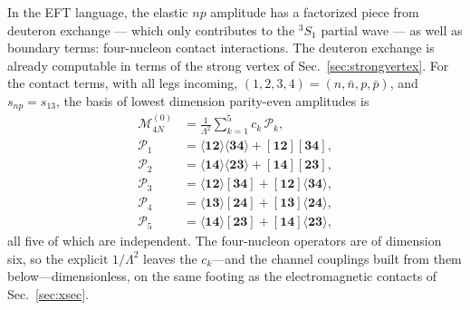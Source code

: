 \documentclass[
  aps,prd,twocolumn,nofootinbib,superscriptaddress,
  longbibliography,floatfix,preprintnumbers
]{revtex4-2}
\newcommand{\ad}[2]{\langle #1 #2\rangle}
\newcommand{\sq}[2]{[#1 #2]}
\begin{document}
In the EFT language, the elastic $np$ amplitude has a factorized piece from deuteron exchange --- which only contributes to the ${}^{3}S_1$ partial wave ---  as well as boundary terms: four-nucleon contact interactions.  The deuteron exchange is already computable in terms of the strong vertex of Sec.~\ref{sec:strongvertex}.  For the contact terms, with all legs incoming,
$(1,2,3,4)=(n,\bar n,p,\bar p)$, and $s_{np}=s_{13}$, the basis of lowest dimension parity-even amplitudes is
\begin{equation}
\begin{split}
  \mathcal{M}^{(0)}_{4N} &= \frac{1}{\Lambda^{2}}\sum_{k=1}^{5} c_k\,\mathcal{P}_k,\\
  \mathcal{P}_1 &= \ad{\bm1}{\bm2}\ad{\bm3}{\bm4}
                 + \sq{\bm1}{\bm2}\sq{\bm3}{\bm4},\\
  \mathcal{P}_2 &= \ad{\bm1}{\bm4}\ad{\bm2}{\bm3}
                 + \sq{\bm1}{\bm4}\sq{\bm2}{\bm3},\\
  \mathcal{P}_3 &= \ad{\bm1}{\bm2}\sq{\bm3}{\bm4}
                 + \sq{\bm1}{\bm2}\ad{\bm3}{\bm4},\\
  \mathcal{P}_4 &= \ad{\bm1}{\bm3}\sq{\bm2}{\bm4}
                 + \sq{\bm1}{\bm3}\ad{\bm2}{\bm4},\\
  \mathcal{P}_5 &= \ad{\bm1}{\bm4}\sq{\bm2}{\bm3}
                 + \sq{\bm1}{\bm4}\ad{\bm2}{\bm3},
\end{split}
\label{eq:nnbasis}
\end{equation}
all five of which are independent. The four-nucleon operators are of
dimension six, so the explicit $1/\Lambda^{2}$ leaves the $c_k$---and the
channel couplings built from them below---dimensionless, on the same footing as
the electromagnetic contacts of Sec.~\ref{sec:xsec}.
\end{document}
